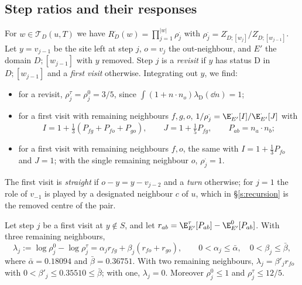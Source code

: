 \subsection{Step ratios and their responses}\label{s:steps}

For $w \in \mathcal T_D(u, T)$ we have $R^\cdot_D(w) = \prod_{j = 1}^{|w|} \rho^\cdot_j$ with $\rho^\cdot_j = Z^\cdot_{D;[w_j]} / Z^\cdot_{D;[w_{j - 1}]}$. Let $y = v_{j - 1}$ be the site left at step $j$, $o = v_j$ the out-neighbour, and $E'$ the domain $D;[w_{j - 1}]$ with $y$ removed. Step $j$ is a \emph{revisit} if $y$ has status $\mathrm D$ in $D;[w_{j - 1}]$ and a \emph{first visit} otherwise. Integrating out $y$, we find:
\begin{itemize}
\item for a revisit, $\rho^\tau_j = \rho^0_j = 3/5$, since $\int (1 + n \cdot n_o) \lambda_{\mathrm D}(\dd n) = 1$;
\item for a first visit with remaining neighbours $f, g, o$, $1/\rho^\cdot_j = \E^\cdot_{E'}[I] / \E^\cdot_{E'}[J]$ with
\begin{equation}\label{e:IJ}
I = 1 + \tfrac13 (P_{fg} + P_{fo} + P_{go}), \qquad J = 1 + \tfrac15 P_{fg}, \qquad P_{ab} = n_a \cdot n_b ;
\end{equation}
\item for a first visit with remaining neighbours $f, o$, the same with $I = 1 + \frac13 P_{fo}$ and $J = 1$; with the single remaining neighbour $o$, $\rho^\cdot_j = 1$.
\end{itemize}
The first visit is \emph{straight} if $o - y = y - v_{j - 2}$ and a \emph{turn} otherwise; for $j = 1$ the role of $v_{-1}$ is played by a designated neighbour $c$ of $u$, which in \S\ref{s:recursion} is the removed centre of the pair.

\begin{lemma}\label{l:response}
Let step $j$ be a first visit at $y \notin S$, and let $r_{ab} = \E^\tau_{E'}[P_{ab}] - \E^0_{E'}[P_{ab}]$. With three remaining neighbours,
\begin{equation}\label{e:lambda}
\lambda_j := \log \rho^0_j - \log \rho^\tau_j = \alpha_j r_{fg} + \beta_j (r_{fo} + r_{go}), \qquad 0 < \alpha_j \le \bar\alpha, \quad 0 < \beta_j \le \bar\beta,
\end{equation}
where $\bar \alpha = 0.18094$ and $\bar \beta = 0.36751$. With two remaining neighbours, $\lambda_j = \beta'_j r_{fo}$ with $0 < \beta'_j \le 0.35510 \le \bar\beta$; with one, $\lambda_j = 0$. Moreover $\rho^0_j \le 1$ and $\rho^\tau_j \le 12/5$.
\end{lemma}

